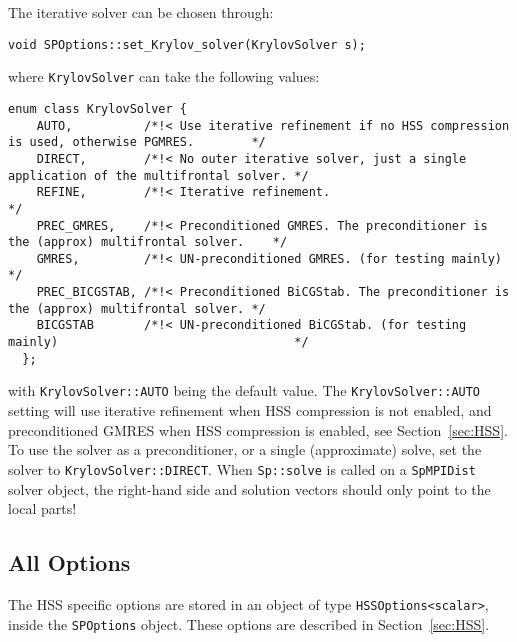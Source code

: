 \documentclass{article}
\begin{document}
The iterative solver can be chosen through:
\begin{lstlisting}[style=C]
  void SPOptions::set_Krylov_solver(KrylovSolver s);
\end{lstlisting}
where \lstinline[style=C]!KrylovSolver! can take the following values:
\begin{lstlisting}[style=C]
  enum class KrylovSolver {
    AUTO,          /*!< Use iterative refinement if no HSS compression is used, otherwise PGMRES.        */
    DIRECT,        /*!< No outer iterative solver, just a single application of the multifrontal solver. */
    REFINE,        /*!< Iterative refinement.                                                            */
    PREC_GMRES,    /*!< Preconditioned GMRES. The preconditioner is the (approx) multifrontal solver.    */
    GMRES,         /*!< UN-preconditioned GMRES. (for testing mainly)                                    */
    PREC_BICGSTAB, /*!< Preconditioned BiCGStab. The preconditioner is the (approx) multifrontal solver. */
    BICGSTAB       /*!< UN-preconditioned BiCGStab. (for testing mainly)                                 */
  };
\end{lstlisting}
with \lstinline[style=C]!KrylovSolver::AUTO! being the default value.
The \lstinline[style=C]!KrylovSolver::AUTO! setting will use iterative
refinement when HSS compression is not enabled, and preconditioned
GMRES when HSS compression is enabled, see Section~\ref{sec:HSS}.  To
use the solver as a preconditioner, or a single (approximate) solve,
set the solver to \lstinline[style=C]!KrylovSolver::DIRECT!. When
\lstinline[style=C]!Sp::solve! is called on a
\lstinline[style=C]!SpMPIDist! solver object, the right-hand side and
solution vectors should only point to the local parts!


\subsection{All Options}
The HSS specific options are stored in an object of type
\lstinline[style=C]!HSSOptions<scalar>!, inside the
\lstinline[style=C]!SPOptions! object. These options are described in
Section~\ref{sec:HSS}.
\end{document}
